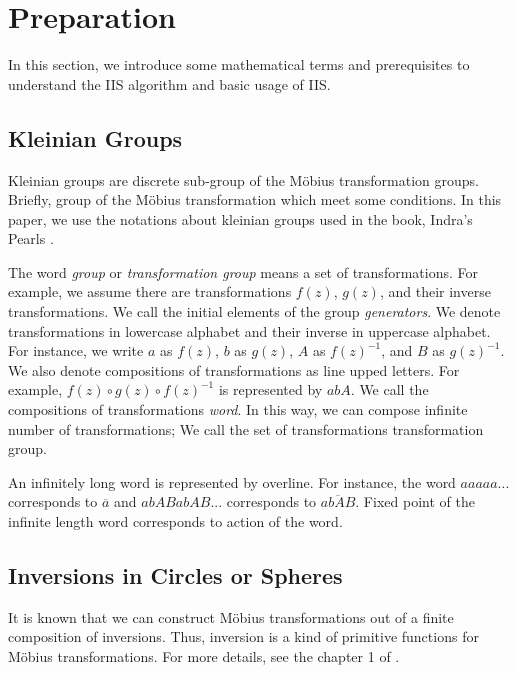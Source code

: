 
\section{Preparation}

In this section, we introduce some mathematical terms and prerequisites
to understand the IIS algorithm and basic usage of IIS.

\subsection{Kleinian Groups}

Kleinian groups are discrete sub-group of the M\"obius transformation
groups. Briefly, group of the M\"obius transformation which meet some conditions.
In this paper, we use the notations about kleinian groups used in the
book, Indra's Pearls \cite{MumfordSeriesWright200204}.

The word \textit{group} or \textit{transformation group} means a set of
transformations. 
For example, we assume there are transformations $f(z)$, $g(z)$, and
their inverse transformations.
We call the initial elements of the group \textit{generators}.
We denote transformations in lowercase alphabet and 
their inverse in uppercase alphabet.
For instance, we write $a$ as $f(z)$, $b$ as $g(z)$, $A$ as $f(z)^{-1}$,
and $B$ as $g(z)^{-1}$.
We also denote compositions of transformations as line upped letters.
For example, $f(z) \circ g(z) \circ f(z)^{-1}$ is represented by $abA$.
We call the compositions of transformations \textit{word}.
In this way, we can compose infinite number of transformations;
We call the set of transformations transformation group.

An infinitely long word is represented by overline.
For instance, the word $aaaaa...$ corresponds to $\overline{a}$ and
$abABabAB...$ corresponds to $\overline{abAB}$.
Fixed point of the infinite length word corresponds to action of the
word.

\subsection{Inversions in Circles or Spheres}

It is known that we can construct M\"obius transformations out of a finite
composition of inversions. Thus, inversion is a kind of primitive
functions for M\"obius transformations.
For more details, see the chapter 1 of \cite{marden_2016}.

